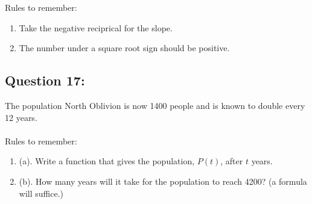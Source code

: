 \documentclass[12pt, letterpaper]{article}
\begin{document}
  Rules to remember:
  \begin{enumerate}
    \item Take the negative reciprical for the slope.
    \item The number under a square root sign should be positive.
  \end{enumerate}

\subsection{Question 17:}
The population North Oblivion is now 1400 people and is known to double every 12 years.
  \\\\
 
  Rules to remember:
  \begin{enumerate}
      \item (a). Write a function that gives the population, $P(t)$, after $t$ years.
      \item (b). How many years will it take for the population to reach 4200? 
        (a formula will suffice.)
  \end{enumerate}
\end{document}
